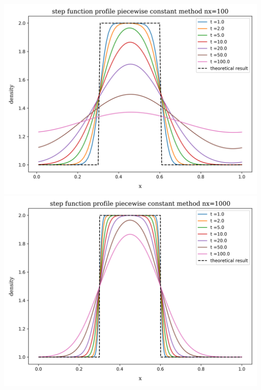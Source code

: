 \begin{frame}
	\vspace{10pt}
	\begin{columns}
			\centering
			\includegraphics[height=.33\textheight]{../results/1D/pwconst/nx=100/plot_advection_step_function_pwconst_nx=100.png}\\
			\includegraphics[height=.33\textheight]{../results/1D/pwconst/nx=1000/plot_advection_step_function_pwconst_nx=1000.png}\\

\end{columns}
\end{frame}

